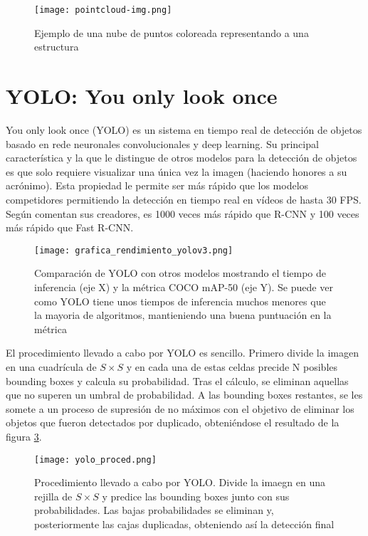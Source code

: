 \begin{figure}[h]
	\begin{center} 
		\texttt{[image: pointcloud-img.png]}
	\end{center}
	\caption{Ejemplo de una nube de puntos coloreada representando a una estructura}
	\label{fig:pc}
\end{figure}

\section{YOLO: You only look once}

You only look once (YOLO) es un sistema en tiempo real de detección de objetos basado en rede neuronales convolucionales y deep learning. Su principal característica y la que le distingue de otros modelos para la detección de objetos es que solo requiere visualizar una única vez la imagen (haciendo honores a su acrónimo). Esta propiedad le permite ser más rápido que los modelos competidores permitiendo la detección en tiempo real en vídeos de hasta 30 FPS. Según comentan sus creadores, es 1000 veces más rápido que R-CNN y 100 veces más rápido que Fast R-CNN.  \cite{yolo} \\

\begin{figure}[H]
	\begin{center} 
		\texttt{[image: grafica\_rendimiento\_yolov3.png]}
	\end{center}
	\caption{Comparación de YOLO con otros modelos mostrando el tiempo de inferencia (eje X) y la métrica COCO mAP-50 (eje Y). Se puede ver como YOLO tiene unos tiempos de inferencia muchos menores que la mayoria de algoritmos, mantieniendo una buena puntuación en la métrica}
	\label{fig:rend}
\end{figure}

El procedimiento llevado a cabo por YOLO es sencillo. Primero divide la imagen en una cuadrícula de $S \times S$ y en cada una de estas celdas precide N posibles bounding boxes y calcula su probabilidad. Tras el cálculo, se eliminan aquellas que no superen un umbral de probabilidad. A las bounding boxes restantes, se les somete a un proceso de supresión de no máximos con el objetivo de eliminar los objetos que fueron detectados por duplicado, obteniéndose el resultado de la figura \ref{fig:proced}.\\

\begin{figure}[h]
	\begin{center} 
		\texttt{[image: yolo\_proced.png]}
	\end{center}
	\caption{Procedimiento llevado a cabo por YOLO. Divide la imaegn en una rejilla de $S \times S$ y predice las bounding boxes junto con sus probabilidades. Las bajas probabilidades se eliminan y, posteriormente las cajas duplicadas, obteniendo así la detección final}
	\label{fig:proced}
\end{figure}

